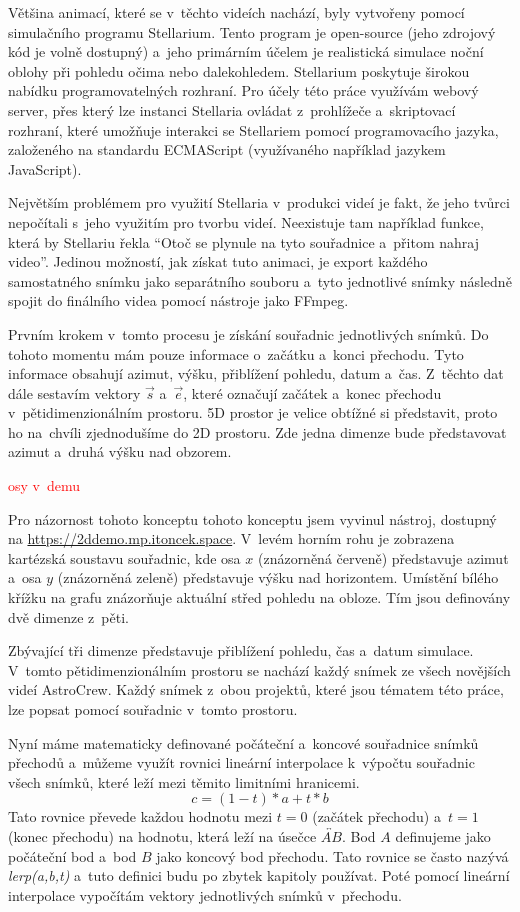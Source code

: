 \documentclass[12pt,a4paper,titlepage]{article}
\begin{document}
Většina animací, které se v~těchto videích nachází, byly vytvořeny pomocí simulačního programu Stellarium. Tento program je open-source (jeho zdrojový kód je volně dostupný) a~jeho primárním účelem je realistická simulace noční oblohy při pohledu očima nebo dalekohledem. Stellarium poskytuje širokou nabídku programovatelných rozhraní. Pro účely této práce využívám webový server, přes který lze instanci Stellaria ovládat z~prohlížeče a~skriptovací rozhraní, které umožňuje interakci se Stellariem pomocí programovacího jazyka, založeného na standardu ECMAScript (využívaného například jazykem JavaScript).

Největším problémem pro využití Stellaria v~produkci videí je fakt, že jeho tvůrci nepočítali s~jeho využitím pro tvorbu videí. Neexistuje tam například funkce, která by Stellariu řekla \enquote{Otoč se plynule na tyto souřadnice a~přitom nahraj video}. Jedinou možností, jak získat tuto animaci, je export každého samostatného snímku jako separátního souboru a~tyto jednotlivé snímky následně spojit do finálního videa pomocí nástroje jako FFmpeg. 

Prvním krokem v~tomto procesu je získání souřadnic jednotlivých snímků. Do tohoto momentu mám pouze informace o~začátku a~konci přechodu. Tyto informace obsahují azimut, výšku, přiblížení pohledu, datum a~čas. Z~těchto dat dále sestavím vektory $\vec{s}$ a~$\vec{e}$, které označují začátek a~konec přechodu v~pětidimenzionálním prostoru. 5D prostor je velice obtížné si představit, proto ho na~chvíli zjednodušíme do 2D prostoru. Zde jedna dimenze bude představovat azimut a~druhá výšku nad obzorem. 

\textcolor{red}{osy v~demu}

Pro názornost tohoto konceptu tohoto konceptu jsem vyvinul nástroj, dostupný na \url{https://2ddemo.mp.itoncek.space}. V~levém horním rohu je zobrazena kartézská soustavu souřadnic, kde osa $x$ (znázorněná červeně) představuje azimut a~osa $y$ (znázorněná zeleně) představuje výšku nad horizontem. Umístění bílého křížku na grafu znázorňuje aktuální střed pohledu na obloze. Tím jsou definovány dvě dimenze z~pěti.

Zbývající tři dimenze představuje přiblížení pohledu, čas a~datum simulace. V~tomto pětidimenzionálním prostoru se nachází každý snímek ze všech novějších videí AstroCrew. Každý snímek z~obou projektů, které jsou tématem této práce, lze popsat pomocí souřadnic v~tomto prostoru.

Nyní máme matematicky definované počáteční a~koncové souřadnice snímků přechodů a~můžeme využít rovnici lineární interpolace k~výpočtu souřadnic všech snímků, které leží mezi těmito limitními hranicemi.
\[c = (1-t)*a + t * b\] 
Tato rovnice převede každou hodnotu mezi $t=0$ (začátek přechodu) a~$t=1$ (konec přechodu) na hodnotu, která leží na úsečce $\overleftrightarrow{AB}$. Bod $A$ definujeme jako počáteční bod a~bod $B$ jako koncový bod přechodu. Tato rovnice se často nazývá \textit{lerp(a,b,t)} a~tuto definici budu po zbytek kapitoly používat. Poté pomocí lineární interpolace vypočítám vektory jednotlivých snímků v~přechodu.%
\end{document}
